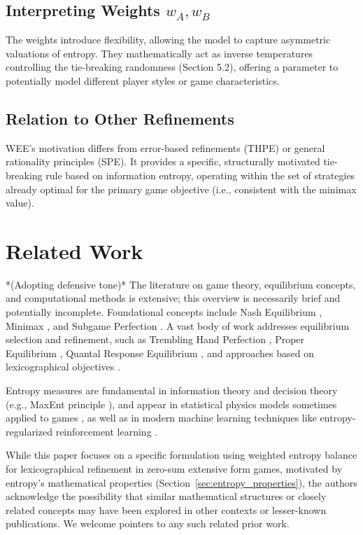\documentclass{article}
\begin{document}
\subsection{Interpreting Weights \texorpdfstring{$w_A, w_B$}{wA, wB}}
The weights introduce flexibility, allowing the model to capture asymmetric valuations of entropy. They mathematically act as inverse temperatures controlling the tie-breaking randomness (Section 5.2), offering a parameter to potentially model different player styles or game characteristics.

\subsection{Relation to Other Refinements}
WEE's motivation differs from error-based refinements (THPE) or general rationality principles (SPE). It provides a specific, structurally motivated tie-breaking rule based on information entropy, operating within the set of strategies already optimal for the primary game objective (i.e., consistent with the minimax value).

\section{Related Work}
*(Adopting defensive tone)*
The literature on game theory, equilibrium concepts, and computational methods is extensive; this overview is necessarily brief and potentially incomplete. Foundational concepts include Nash Equilibrium \cite{placeholder_nash}, Minimax \cite{placeholder_vonneumann}, and Subgame Perfection \cite{placeholder_selten_spe}. A vast body of work addresses equilibrium selection and refinement, such as Trembling Hand Perfection \cite{placeholder_selten_thpe}, Proper Equilibrium \cite{placeholder_myerson}, Quantal Response Equilibrium \cite{placeholder_qre}, and approaches based on lexicographical objectives \cite{placeholder_lexico_games}.

Entropy measures are fundamental in information theory \cite{placeholder_cover_thomas} and decision theory (e.g., MaxEnt principle \cite{placeholder_jaynes}), and appear in statistical physics models sometimes applied to games \cite{placeholder_statphys_games}, as well as in modern machine learning techniques like entropy-regularized reinforcement learning \cite{placeholder_entropy_rl}.

While this paper focuses on a specific formulation using weighted entropy balance for lexicographical refinement in zero-sum extensive form games, motivated by entropy's mathematical properties (Section~\ref{sec:entropy_properties}), the authors acknowledge the possibility that similar mathematical structures or closely related concepts may have been explored in other contexts or lesser-known publications. We welcome pointers to any such related prior work.
\end{document}
